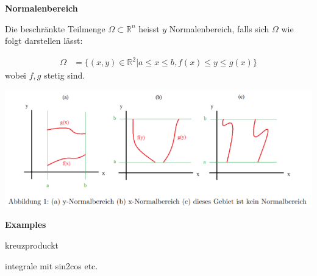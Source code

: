 \documentclass[25pt]{sciposter}
\newcommand{\R}{\mathbb{R}}
\newenvironment{method}[1]{\begin{mdframed}[backgroundcolor=blue!10,innertopmargin=15pt, innerbottommargin=15pt, nobreak=true]
		\textbf{#1 }
	}
	{ 
	\end{mdframed}
}
\begin{document}
\begin{multicols}{3}
\begin{method}{Normalenbereich}
	Die beschränkte Teilmenge $\Omega \subset \R^n$ heisst $y$ Normalenbereich, falls sich $\Omega$ wie folgt darstellen lässt:
	
	\begin{align*}
		\Omega &= \{(x,y)\in\R^2 | a \leq x \leq b, f(x)\leq y \leq g(x)\}
	\end{align*}
	wobei $f,g$ stetig sind.
	
	\includegraphics[width=\textwidth]{normBe.png}
	
\end{method}


\textbf{Examples}



kreuzproduckt


integrale mit sin2cos etc.


\end{multicols}
\end{document}
